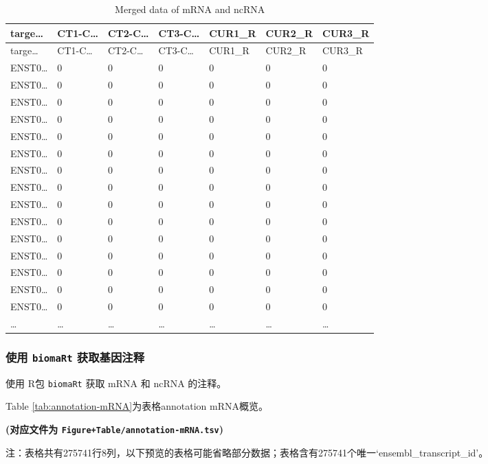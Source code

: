 \documentclass[
]{article}
\begin{document}
\begin{longtable}[]{@{}lllllll@{}}
\caption{\label{tab:merged-data-of-mRNA-and-ncRNA}Merged data of mRNA and ncRNA}\tabularnewline
\toprule
targe\ldots{} & CT1-C\ldots{} & CT2-C\ldots{} & CT3-C\ldots{} & CUR1\_R & CUR2\_R & CUR3\_R\tabularnewline
\midrule
\endfirsthead
\toprule
targe\ldots{} & CT1-C\ldots{} & CT2-C\ldots{} & CT3-C\ldots{} & CUR1\_R & CUR2\_R & CUR3\_R\tabularnewline
\midrule
\endhead
ENST0\ldots{} & 0 & 0 & 0 & 0 & 0 & 0\tabularnewline
ENST0\ldots{} & 0 & 0 & 0 & 0 & 0 & 0\tabularnewline
ENST0\ldots{} & 0 & 0 & 0 & 0 & 0 & 0\tabularnewline
ENST0\ldots{} & 0 & 0 & 0 & 0 & 0 & 0\tabularnewline
ENST0\ldots{} & 0 & 0 & 0 & 0 & 0 & 0\tabularnewline
ENST0\ldots{} & 0 & 0 & 0 & 0 & 0 & 0\tabularnewline
ENST0\ldots{} & 0 & 0 & 0 & 0 & 0 & 0\tabularnewline
ENST0\ldots{} & 0 & 0 & 0 & 0 & 0 & 0\tabularnewline
ENST0\ldots{} & 0 & 0 & 0 & 0 & 0 & 0\tabularnewline
ENST0\ldots{} & 0 & 0 & 0 & 0 & 0 & 0\tabularnewline
ENST0\ldots{} & 0 & 0 & 0 & 0 & 0 & 0\tabularnewline
ENST0\ldots{} & 0 & 0 & 0 & 0 & 0 & 0\tabularnewline
ENST0\ldots{} & 0 & 0 & 0 & 0 & 0 & 0\tabularnewline
ENST0\ldots{} & 0 & 0 & 0 & 0 & 0 & 0\tabularnewline
ENST0\ldots{} & 0 & 0 & 0 & 0 & 0 & 0\tabularnewline
\ldots{} & \ldots{} & \ldots{} & \ldots{} & \ldots{} & \ldots{} & \ldots{}\tabularnewline
\bottomrule
\end{longtable}

\hypertarget{ux4f7fux7528-biomart-ux83b7ux53d6ux57faux56e0ux6ce8ux91ca}{%
\subsubsection{\texorpdfstring{使用 \texttt{biomaRt} 获取基因注释}{使用 biomaRt 获取基因注释}}\label{ux4f7fux7528-biomart-ux83b7ux53d6ux57faux56e0ux6ce8ux91ca}}

使用 R包 \texttt{biomaRt} 获取 mRNA 和 ncRNA 的注释。

Table \ref{tab:annotation-mRNA}为表格annotation mRNA概览。

\textbf{(对应文件为 \texttt{Figure+Table/annotation-mRNA.tsv})}

\begin{center}\begin{tcolorbox}[colback=gray!10, colframe=gray!50, width=0.9\linewidth, arc=1mm, boxrule=0.5pt]注：表格共有275741行8列，以下预览的表格可能省略部分数据；表格含有275741个唯一`ensembl\_transcript\_id'。
\end{tcolorbox}
\end{center}
\end{document}
